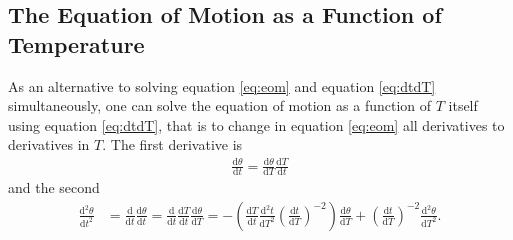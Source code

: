 \documentclass[a4paper, 12pt]{article}
\newcommand{\diff}{\mathrm{d}}
\begin{document}
\subsection{The Equation of Motion as a Function of Temperature}
As an alternative to solving equation \ref{eq:eom} and
equation \ref{eq:dtdT} simultaneously, one can
solve the equation of motion as a function of $T$ itself using equation \ref{eq:dtdT},
that is to change in equation \ref{eq:eom} all derivatives to derivatives in $T$.
The first derivative is
\begin{align*}
    \frac{\diff  \theta}{\diff  t} = \frac{\diff  \theta}{\diff  T} \frac{\diff  T}{\diff  t}
\end{align*}
and the second
\begin{align*}
    \frac{\diff ^2 \theta}{\diff  t^2} &= \frac{\diff }{\diff  t} \frac{\diff  \theta}{\diff  t}
    = \frac{\diff }{\diff  t} \frac{\diff  T}{\diff  t} \frac{\diff  \theta}{\diff  T}
    = - \left(\frac{\diff T}{\diff t} \frac{\diff^2 t}{\diff T^2} \left( \frac{\diff t}{\diff T} \right)^{-2} \right) \frac{\diff  \theta}{\diff  T} +
      \left( \frac{\diff  t}{\diff  T} \right)^{-2} \frac{\diff^2  \theta}{\diff  T^2}.
\end{align*}
\end{document}
